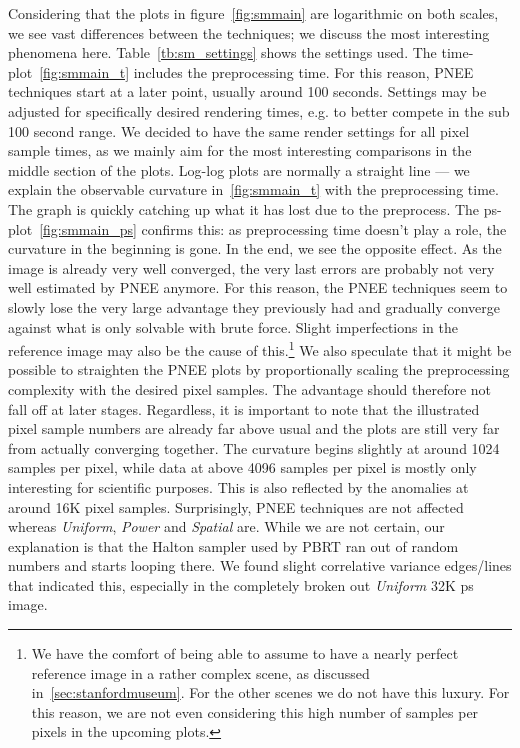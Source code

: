 Considering that the plots in figure~\ref{fig:smmain} are logarithmic on both scales, we see vast differences between the techniques; we discuss the most interesting phenomena here. Table~\ref{tb:sm_settings} shows the settings used. The time-plot~\ref{fig:smmain_t} includes the preprocessing time. For this reason, PNEE techniques start at a later point, usually around 100 seconds. Settings may be adjusted for specifically desired rendering times, e.g. to better compete in the sub 100 second range. We decided to have the same render settings for all pixel sample times, as we mainly aim for the most interesting comparisons in the middle section of the plots. Log-log plots are normally a straight line — we explain the observable curvature in~\ref{fig:smmain_t} with the preprocessing time. The graph is quickly catching up what it has lost due to the preprocess. The ps-plot~\ref{fig:smmain_ps} confirms this: as preprocessing time doesn't play a role, the curvature in the beginning is gone. In the end, we see the opposite effect. As the image is already very well converged, the very last errors are probably not very well estimated by PNEE anymore. For this reason, the PNEE techniques seem to slowly lose the very large advantage they previously had and gradually converge against what is only solvable with brute force. Slight imperfections in the reference image may also be the cause of this.\footnote{We have the comfort of being able to assume to have a nearly perfect reference image in a rather complex scene, as discussed in~\ref{sec:stanfordmuseum}. For the other scenes we do not have this luxury. For this reason, we are not even considering this high number of samples per pixels in the upcoming plots.} We also speculate that it might be possible to straighten the PNEE plots by proportionally scaling the preprocessing complexity with the desired pixel samples. The advantage should therefore not fall off at later stages. Regardless, it is important to note that the illustrated pixel sample numbers are already far above usual and the plots are still very far from actually converging together. The curvature begins slightly at around 1024 samples per pixel, while data at above 4096 samples per pixel is mostly only interesting for scientific purposes. This is also reflected by the anomalies at around 16K pixel samples. Surprisingly, PNEE techniques are not affected whereas \textit{Uniform}, \textit{Power} and \textit{Spatial} are. While we are not certain, our explanation is that the Halton sampler used by PBRT ran out of random numbers and starts looping there. We found slight correlative variance edges/lines that indicated this, especially in the completely broken out \textit{Uniform} 32K ps image.

